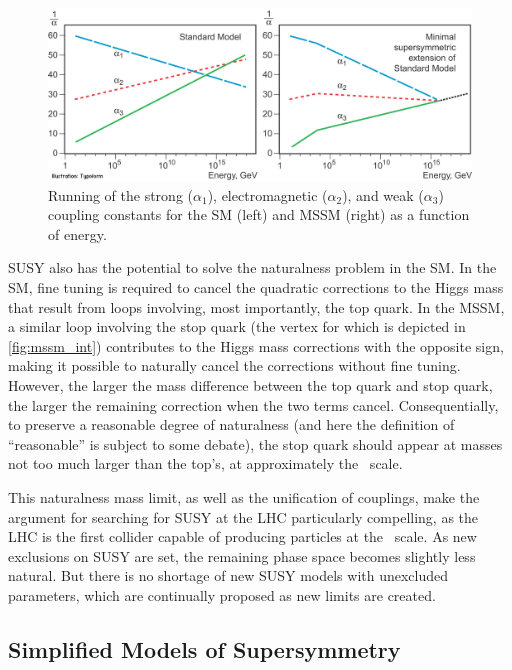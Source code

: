 \begin{centering}
\begin{figure}[!hbt]
\myfloatalign
\includegraphics[width=.9\linewidth]{figures/theory/phypub4highen.jpg}
\caption{Running of the strong ($\alpha_1$), electromagnetic ($\alpha_2$), and weak ($\alpha_3$) coupling constants for the \ac{SM} (left) and \ac{MSSM} (right) as a function of energy. \cite{nobel2004}}
\label{fig:gut_mssm}
\end{figure}
\end{centering}

\ac{SUSY} also has the potential to solve the naturalness problem in the \ac{SM}. In the \ac{SM}, fine tuning is required to cancel the quadratic corrections to the Higgs mass that result from loops involving, most importantly, the top quark. In the \ac{MSSM}, a similar loop involving the stop quark (the vertex for which is depicted in \autoref{fig:mssm_int}) contributes to the Higgs mass corrections with the opposite sign, making it possible to naturally cancel the corrections without fine tuning. However, the larger the mass difference between the top quark and stop quark, the larger the remaining correction when the two terms cancel. Consequentially, to preserve a reasonable degree of naturalness (and here the definition of ``reasonable'' is subject to some debate), the stop quark should appear at masses not too much larger than the top's, at approximately the \tev~scale. 

This naturalness mass limit, as well as the unification of couplings, make the argument for searching for \ac{SUSY} at the \ac{LHC} particularly compelling, as the \ac{LHC} is the first collider capable of producing particles at the \tev~scale. As new exclusions on \ac{SUSY} are set, the remaining phase space becomes slightly less natural. But there is no shortage of new \ac{SUSY} models with unexcluded parameters, which are continually proposed as new limits are created. 

\subsection{Simplified Models of Supersymmetry}
\label{sec:simplified_models}

